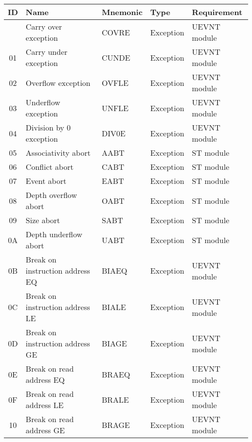 \begin{table}[hbt!]

    \begin{center}

    \begin{tabular}{|c|l|l|l|l|}

        \hline
        ID & Name & Mnemonic & Type & Requirement\\
        \hline
        \addlinespace[10pt]
        \hline
        00 & Carry over exception & COVRE & Exception & UEVNT module\\
        \hline
        01 & Carry under exception & CUNDE & Exception & UEVNT module \\
        \hline
        02 & Overflow exception & OVFLE & Exception & UEVNT module \\
        \hline
        03 & Underflow exception & UNFLE & Exception & UEVNT module \\
        \hline
        04 & Division by 0 exception & DIV0E & Exception & UEVNT module \\
        \hline
        05 & Associativity abort & AABT & Exception & ST module \\
        \hline
        06 & Conflict abort & CABT & Exception & ST module \\
        \hline
        07 & Event abort & EABT & Exception & ST module \\
        \hline
        08 & Depth overflow abort & OABT & Exception & ST module \\
        \hline
        09 & Size abort & SABT & Exception & ST module \\
        \hline
        0A & Depth underflow abort & UABT & Exception & ST module \\
        \hline
        0B & Break on instruction address EQ & BIAEQ & Exception & UEVNT module \\
        \hline
        0C & Break on instruction address LE & BIALE & Exception & UEVNT module \\
        \hline
        0D & Break on instruction address GE & BIAGE & Exception & UEVNT module \\
        \hline
        0E & Break on read address EQ & BRAEQ & Exception & UEVNT module \\
        \hline
        0F & Break on read address LE & BRALE & Exception & UEVNT module \\
        \hline
        10 & Break on read address GE & BRAGE & Exception & UEVNT module \\

\end{tabular}
\end{center}
\end{table}
